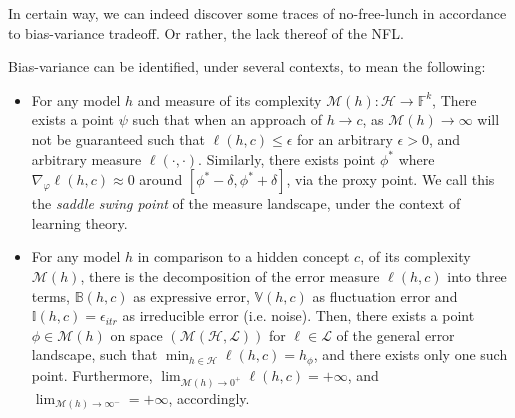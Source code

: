 In certain way, we can indeed discover some traces of no-free-lunch in accordance to bias-variance tradeoff. Or rather, the lack thereof of the NFL. 

\begin{conjecture}
    Bias-variance can be identified, under several contexts, to mean the following: \begin{itemize}
        \item For any model $h$ and measure of its complexity $\mathcal{M}(h):\mathcal{H}\to \mathbb{F}^{k}$, There exists a point $\psi$ such that when an approach of $h\to c$, as $\mathcal{M}(h)\to\infty$ will not be guaranteed such that $\ell(h,c)\leq \epsilon$ for an arbitrary $\epsilon>0$, and arbitrary measure $\ell(\cdot,\cdot)$. Similarly, there exists point $\phi^{*}$ where $\nabla_{\varphi}\ell(h,c)\approx 0$ around $[\phi^{*}-\delta,\phi^{*}+\delta]$, via the proxy point. We call this the \textit{saddle swing point} of the measure landscape, under the context of learning theory.
        \item For any model $h$ in comparison to a hidden concept $c$, of its complexity $\mathcal{M}(h)$, there is the decomposition of the error measure $\ell(h,c)$ into three terms, $\mathbb{B}(h,c)$ as expressive error, $\mathbb{V}(h,c)$ as fluctuation error and $\mathbb{I}(h,c)=\epsilon_{itr}$ as irreducible error (i.e. noise). Then, there exists a point $\phi\in \mathcal{M}(h)$ on space $(\mathcal{M}(\mathcal{H},\mathcal{L}))$ for $\ell \in \mathcal{L}$ of the general error landscape, such that $\min_{h\in \mathcal{H}}\ell(h,c)= h_{\phi}$, and there exists only one such point. Furthermore, $\lim_{\mathcal{M}(h)\to 0^{+}}\ell(h,c) = +\infty$, and $\lim_{\mathcal{M}(h)\to \infty^{-}}=+\infty$, accordingly. 
    \end{itemize}
\end{conjecture}

